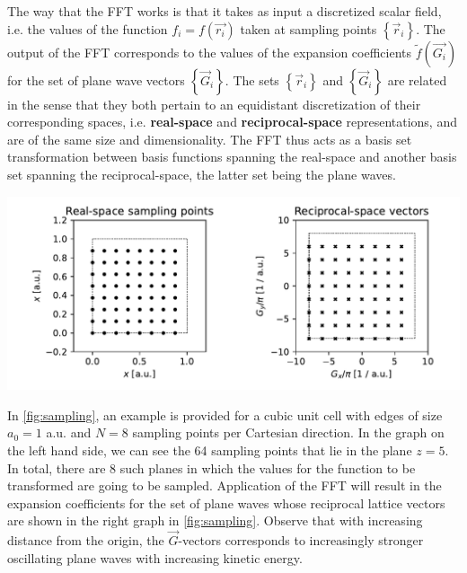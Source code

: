 The way that the FFT works is that it takes as input a discretized scalar field, i.e. the values of the function $f_{i} = f(\vec{r_{i}})$ taken at sampling points $\left\{\vec{r}_{i}\right\}$. The output of the FFT corresponds to the values of the expansion coefficients $\tilde{f}(\vec{G_{i}})$ for the set of plane wave vectors $\left\{ \vec{G}_{i} \right\}$. The sets $\left\{\vec{r}_{i}\right\}$ and $\left\{\vec{G}_{i}\right\}$ are related in the sense that they both pertain to an equidistant discretization of their corresponding spaces, i.e. \textbf{real-space} and \textbf{reciprocal-space} representations, and are of the same size and dimensionality. The FFT thus acts as a basis set transformation between basis functions spanning the real-space and another basis set spanning the reciprocal-space, the latter set being the plane waves.

\begin{Figure}
    \centering
    \includegraphics[width=\linewidth]{img/sampling.pdf}
    \label{fig:sampling}
\end{Figure}

In \cref{fig:sampling}, an example is provided for a cubic unit cell with edges of size $a_{0} = 1$ a.u. and $N = 8$ sampling points per Cartesian direction. In the graph on the left hand side, we can see the 64 sampling points that lie in the plane $z=5$. In total, there are 8 such planes in which the values for the function to be transformed are going to be sampled. Application of the FFT will result in the expansion coefficients for the set of plane waves whose reciprocal lattice vectors are shown in the right graph in \cref{fig:sampling}. Observe that with increasing distance from the origin, the $\vec{G}$-vectors corresponds to increasingly stronger oscillating plane waves with increasing kinetic energy.

